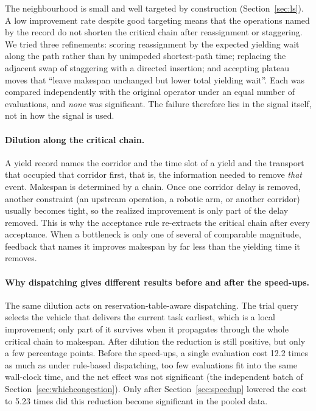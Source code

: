 \documentclass[manuscript,screen,review]{acmart}
\newcommand{\CostMultBefore}{12.2}
\newcommand{\CostMultAfter}{5.23}
\begin{document}
The neighbourhood is small and well targeted by construction (Section~\ref{sec:ls}). A low improvement rate despite good targeting means that the operations named by the record do not shorten the critical chain after reassignment or staggering.
We tried three refinements: scoring reassignment by the expected yielding wait along the path rather than by unimpeded shortest-path time; replacing the adjacent swap of staggering with a directed insertion; and accepting plateau moves that ``leave makespan unchanged but lower total yielding wait''. Each was compared independently with the original operator under an equal number of evaluations, and \emph{none} was significant. The failure therefore lies in the signal itself, not in how the signal is used.

\paragraph{Dilution along the critical chain.}
A yield record names the corridor and the time slot of a yield and the transport that occupied that corridor first, that is, the information needed to remove \emph{that} event.
Makespan is determined by a chain. Once one corridor delay is removed, another constraint (an upstream operation, a robotic arm, or another corridor) usually becomes tight, so the realized improvement is only part of the delay removed.
This is why the acceptance rule re-extracts the critical chain after every acceptance. When a bottleneck is only one of several of comparable magnitude, feedback that names it improves makespan by far less than the yielding time it removes.

\paragraph{Why dispatching gives different results before and after the speed-ups.}
The same dilution acts on reservation-table-aware dispatching. The trial query selects the vehicle that delivers the current task earliest, which is a local improvement; only part of it survives when it propagates through the whole critical chain to makespan.
After dilution the reduction is still positive, but only a few percentage points. Before the speed-ups, a single evaluation cost \CostMultBefore{} times as much as under rule-based dispatching, too few evaluations fit into the same wall-clock time, and the net effect was not significant (the independent batch of Section~\ref{sec:whichcongestion}).
Only after Section~\ref{sec:speedup} lowered the cost to \CostMultAfter{} times did this reduction become significant in the pooled data.
\end{document}
